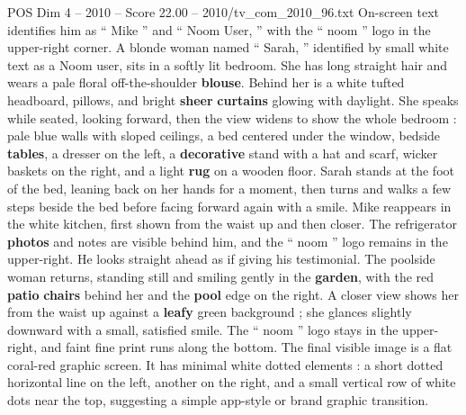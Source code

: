 \begin{textsample}{POS Dim 4 – 2010 – Score 22.00 – 2010/tv\_com\_2010\_96.txt}
On-screen text identifies him as “ Mike ” and “ Noom User, ” with the “ noom ” logo in the upper-right corner.
A blonde woman named “ Sarah, ” identified by small white text as a Noom user, sits in a softly lit bedroom.
She has long straight hair and wears a pale floral off-the-shoulder \textbf{blouse}.
Behind her is a white tufted headboard, pillows, and bright \textbf{sheer} \textbf{curtains} glowing with daylight.
She speaks while seated, looking forward, then the view widens to show the whole bedroom : pale blue walls with sloped ceilings, a bed centered under the window, bedside \textbf{tables}, a dresser on the left, a \textbf{decorative} stand with a hat and scarf, wicker baskets on the right, and a light \textbf{rug} on a wooden floor.
Sarah stands at the foot of the bed, leaning back on her hands for a moment, then turns and walks a few steps beside the bed before facing forward again with a smile.
Mike reappears in the white kitchen, first shown from the waist up and then closer.
The refrigerator \textbf{photos} and notes are visible behind him, and the “ noom ” logo remains in the upper-right.
He looks straight ahead as if giving his testimonial.
The poolside woman returns, standing still and smiling gently in the \textbf{garden}, with the red \textbf{patio} \textbf{chairs} behind her and the \textbf{pool} edge on the right.
A closer view shows her from the waist up against a \textbf{leafy} green background ; she glances slightly downward with a small, satisfied smile.
The “ noom ” logo stays in the upper-right, and faint fine print runs along the bottom.
The final visible image is a flat coral-red graphic screen.
It has minimal white dotted elements : a short dotted horizontal line on the left, another on the right, and a small vertical row of white dots near the top, suggesting a simple app-style or brand graphic transition.

\end{textsample}
